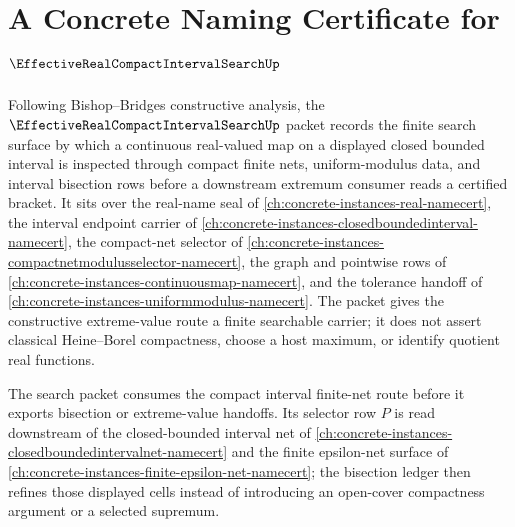 \chapter{A Concrete Naming Certificate for $\EffectiveRealCompactIntervalSearchUp$}
\label{ch:concrete-instances-effective-real-compact-interval-search-namecert}

Following Bishop--Bridges constructive analysis, the $\EffectiveRealCompactIntervalSearchUp$ packet records the finite search surface by which a continuous real-valued map on a displayed closed bounded interval is inspected through compact finite nets, uniform-modulus data, and interval bisection rows before a downstream extremum consumer reads a certified bracket. It sits over the real-name seal of \autoref{ch:concrete-instances-real-namecert}, the interval endpoint carrier of \autoref{ch:concrete-instances-closedboundedinterval-namecert}, the compact-net selector of \autoref{ch:concrete-instances-compactnetmodulusselector-namecert}, the graph and pointwise rows of \autoref{ch:concrete-instances-continuousmap-namecert}, and the tolerance handoff of \autoref{ch:concrete-instances-uniformmodulus-namecert}. The packet gives the constructive extreme-value route a finite searchable carrier; it does not assert classical Heine--Borel compactness, choose a host maximum, or identify quotient real functions.

The search packet consumes the compact interval finite-net route before it exports bisection or extreme-value handoffs. Its selector row $P$ is read downstream of the closed-bounded interval net of \autoref{ch:concrete-instances-closedboundedintervalnet-namecert} and the finite epsilon-net surface of \autoref{ch:concrete-instances-finite-epsilon-net-namecert}; the bisection ledger then refines those displayed cells instead of introducing an open-cover compactness argument or a selected supremum.

